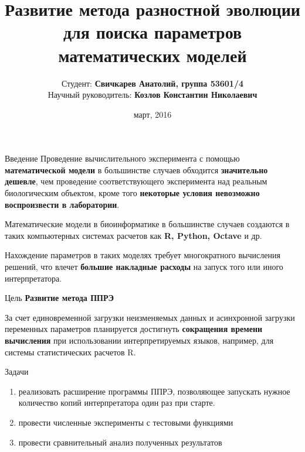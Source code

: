 \documentclass{beamer}
\begin{document}
\title[Развитие ППРЭ]
{Развитие метода разностной эволюции
для поиска параметров математических моделей}
\author[Свичкарев Анатолий]
{Студент: \textbf{Свичкарев Анатолий, группа 53601/4}\\
Научный руководитель: \textbf{Козлов Константин Николаевич}}
\date{март, 2016}

\frame{\titlepage} 

\begin{frame}{Введение}
Проведение вычислительного эксперимента
с помощью \textbf{математической модели}
в большинстве случаев обходится \textbf{значительно дешевле},
чем проведение соответствующего эксперимента
над реальным биологическим объектом,
кроме того \textbf{некоторые условия
невозможно воспроизвести в лаборатории}.
\bigskip

Математические модели в биоинформатике в
большинстве случаев создаются в таких компьютерных
системах расчетов как \textbf{R, Python, Octave} и др.
\bigskip

Нахождение параметров в таких моделях требует
многократного вычисления решений, что влечет
\textbf{большие накладные расходы} на запуск того или иного
интерпретатора.
\end{frame}

\begin{frame}{Цель}
\textbf{Развитие метода ППРЭ}

\bigskip
За счет единовременной загрузки
неизменяемых данных и
асинхронной загрузки переменных параметров
планируется достигнуть
\textbf{сокращения времени вычисления}
при использовании
интерпретируемых языков, например,
для системы статистических расчетов R.
\end{frame}

\begin{frame}{Задачи}
\begin{enumerate}
    \itemsep 2em
    \item реализовать расширение программы ППРЭ,
        позволяющее запускать нужное количество копий
        интерпретатора один раз при старте.
    \item провести численные эксперименты с тестовыми функциями
    \item провести сравнительный анализ полученных результатов
\end{enumerate}
\end{frame}
\end{document}
